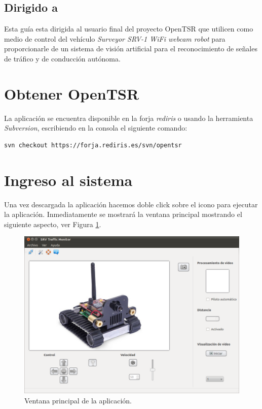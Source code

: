 \subsection{Dirigido a}

Esta guía esta dirigida al usuario final del proyecto OpenTSR que utilicen como medio de control del vehículo \emph{Surveyor SRV-1 WiFi webcam robot} para proporcionarle de un sistema de visión artificial para el reconocimiento de señales de tráfico y de conducción autónoma.

\section{Obtener OpenTSR}

La aplicación se encuentra disponible en la forja \emph{rediris}\cite{website:iris} o usando la herramienta \emph{Subversion}\cite{librosvn}, escribiendo en la consola el siguiente comando:\\

\begin{lstlisting}[style=consola]
svn checkout https://forja.rediris.es/svn/opentsr
\end{lstlisting}

\section{Ingreso al sistema}

Una vez descargada la aplicación hacemos doble click sobre el icono para ejecutar la aplicación. Inmediatamente se mostrará la ventana principal mostrando el siguiente aspecto, ver Figura \ref{fig:ventana-principal}.\\

\begin{figure}[H]
  \begin{center}
    \includegraphics[scale=0.5]{../imagenes/ventana-principal.png}
  \end{center}
  \caption{Ventana principal de la aplicación.}
  \label{fig:ventana-principal}
\end{figure}

